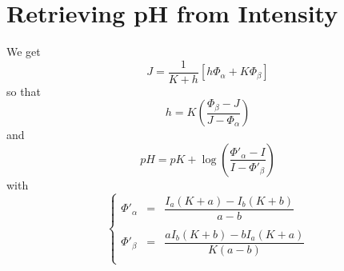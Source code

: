 \documentclass[aps]{revtex4}
\begin{document}
\section{Retrieving pH from Intensity}
We get
\begin{equation}
	J = \dfrac{1}{K+h} \left[ h \Phi_\alpha + K \Phi_\beta \right]
\end{equation}
so that
\begin{equation}
	h = K \left( \dfrac{\Phi_\beta-J}{J-\Phi_\alpha} \right)
\end{equation}
and
\begin{equation}
	pH = pK + \log \left( \dfrac{\Phi'_\alpha-I}{I-\Phi'_\beta}\right)
\end{equation}
with
\begin{equation}
	\left\lbrace
\displaystyle
	\begin{array}{rcl}
	\Phi'_\alpha & = & \dfrac{I_a(K+a)-I_b(K+b)}{a-b}\\
	\\
	\Phi'_\beta & = & \dfrac{aI_b(K+b)-bI_a(K+a)}{K(a-b)}\\
	\end{array}
\right.
\end{equation}
\end{document}
